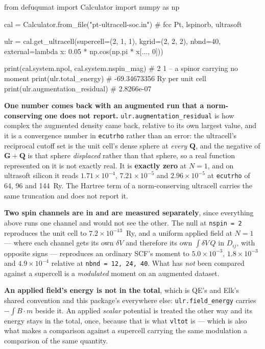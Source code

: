 \documentclass[11pt,a4paper]{article}
\newcommand{\code}[1]{\texttt{\small #1}}
\begin{document}
\begin{pycode}
from defuqumat import Calculator
import numpy as np

cal = Calculator.from_file("pt-ultracell-soc.in")   # fcc Pt, lspinorb, ultrasoft

ulr = cal.get_ultracell(supercell=(2, 1, 1), kgrid=(2, 2, 2), nbnd=40,
                        external=lambda x: 0.05 * np.cos(np.pi * x[..., 0]))

print(cal.system.npol, cal.system.nspin_mag)  # 2 1 -- a spinor carrying no moment
print(ulr.total_energy)                       # -69.34673356 Ry per unit cell
print(ulr.augmentation_residual)              # 2.8266e-07
\end{pycode}

\textbf{One number comes back with an augmented run that a norm-conserving one
does not report.} \code{ulr.augmentation\_residual} is how complex the augmented
density came back, relative to its own largest value, and it is a convergence
number in \code{ecutrho} rather than an error: the ultracell's reciprocal cutoff
set is the unit cell's dense sphere at \emph{every} $\mathbf Q$, and the negative
of $\mathbf G + \mathbf Q$ is that sphere \emph{displaced} rather than that
sphere, so a real function represented on it is not exactly real. It is
\textbf{exactly zero} at $N=1$, and on ultrasoft silicon it reads
$1.71\times10^{-4}$, $7.21\times10^{-5}$ and $2.96\times10^{-5}$ at
\code{ecutrho} of 64, 96 and 144~Ry. The Hartree term of a norm-conserving
ultracell carries the same truncation and does not report it.

\textbf{Two spin channels are in and are measured separately}, since everything
above runs one channel and would not see the other. The null at \code{nspin = 2}
reproduces the unit cell to $7.2\times10^{-13}$~Ry, and a uniform applied field at
$N=1$ --- where each channel gets its own $\delta V$ and therefore its own
$\int \delta V\,Q$ in $D_{ij}$, with opposite signs --- reproduces an ordinary
SCF's moment to $5.0\times10^{-3}$, $1.8\times10^{-3}$ and $4.9\times10^{-4}$
relative at \code{nbnd = 12, 24, 40}. What has \emph{not} been compared against a
supercell is a \emph{modulated} moment on an augmented dataset.

\textbf{An applied field's energy is not in the total}, which is QE's and Elk's
shared convention and this package's everywhere else: \code{ulr.field\_energy}
carries $-\int B\cdot m$ beside it. An applied \emph{scalar} potential is
treated the other way and its energy stays in the total, once, because that is
what \code{vltot} is --- which is also what makes a comparison against a
supercell carrying the same modulation a comparison of the same quantity.
\end{document}
